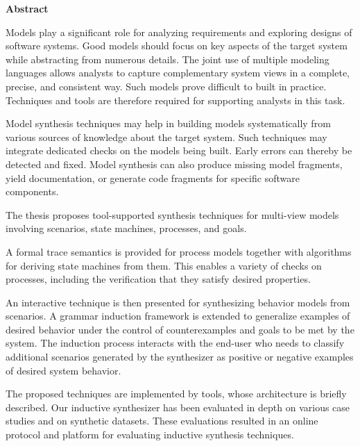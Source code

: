 \begin{center}
\textbf{\large Abstract}
\end{center}

Models play a significant role for analyzing requirements and exploring designs of software systems. Good models should focus on key aspects of the target system while abstracting from numerous details. The joint use of multiple modeling languages allows analysts to capture complementary system views in a complete, precise, and consistent way. Such models prove difficult to built in practice. Techniques and tools are therefore required for supporting analysts in this task.

Model synthesis techniques may help in building models systematically from various sources of knowledge about the target system. Such techniques may integrate dedicated checks on the models being built. Early errors can thereby be detected and fixed. Model synthesis can also produce missing model fragments, yield documentation, or generate code fragments for specific software components.

The thesis proposes tool-supported synthesis techniques for multi-view models involving scenarios, state machines, processes, and goals. 

A formal trace semantics is provided for process models together with algorithms for deriving state machines from them. This enables a variety of checks on processes, including the verification that they satisfy desired properties.

An interactive technique is then presented for synthesizing behavior models from scenarios. A grammar induction framework is extended to generalize examples of desired behavior under the control of counterexamples and goals to be met by the system. The induction process interacts with the end-user who needs to classify additional scenarios generated by the synthesizer as positive or negative examples of desired system behavior.

The proposed techniques are implemented by tools, whose architecture is briefly described. Our inductive synthesizer has been evaluated in depth on various case studies and on synthetic datasets. These evaluations resulted in an online protocol and platform for evaluating inductive synthesis techniques.

